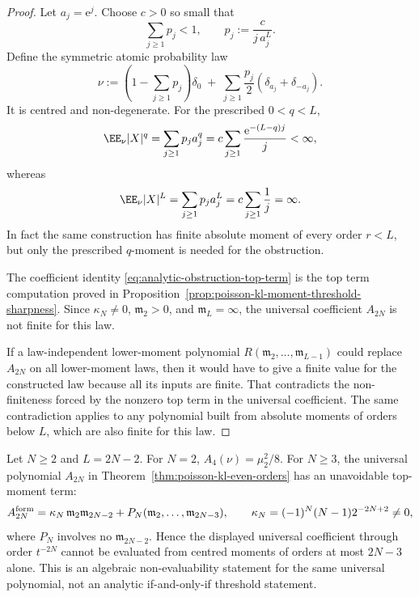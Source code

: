 \begin{proof}
Let \(a_j=\mathrm e^j\).  Choose \(c>0\) so small that
\[
\sum_{j\ge1}p_j<1,\qquad
p_j:=\frac{c}{j\,a_j^L}.
\]
Define the symmetric atomic probability law
\[
\nu:=\left(1-\sum_{j\ge1}p_j\right)\delta_0
\;+\;
\sum_{j\ge1}\frac{p_j}{2}(\delta_{a_j}+\delta_{-a_j}).
\]
It is centred and non-degenerate.  For the prescribed \(0<q<L\),
\[
\EE_\nu |X|^q=\sum_{j\ge1}p_ja_j^q
=c\sum_{j\ge1}\frac{\mathrm e^{-(L-q)j}}{j}<\infty,
\]
whereas
\[
\EE_\nu |X|^L=\sum_{j\ge1}p_ja_j^L
=c\sum_{j\ge1}\frac1j=\infty.
\]
In fact the same construction has finite absolute moment of every order
\(r<L\), but only the prescribed \(q\)-moment is needed for the obstruction.

The coefficient identity \eqref{eq:analytic-obstruction-top-term} is the top
term computation proved in
Proposition~\ref{prop:poisson-kl-moment-threshold-sharpness}.  Since
\(\kappa_N\ne0\), \(\mathfrak m_2>0\), and \(\mathfrak m_L=\infty\), the
universal coefficient \(A_{2N}\) is not finite for this law.

If a law-independent lower-moment polynomial
\(R(\mathfrak m_2,\ldots,\mathfrak m_{L-1})\) could replace \(A_{2N}\) on
all lower-moment laws, then it would have to give a finite value for the
constructed law because all its inputs are finite.  That contradicts the
non-finiteness forced by the nonzero top term in the universal coefficient.
The same contradiction applies to any polynomial built from absolute moments
of orders below \(L\), which are also finite for this law.
\end{proof}

\begin{proposition}%
\label{prop:poisson-kl-moment-threshold-sharpness}
Let \(N\ge2\) and \(L=2N-2\).
For \(N=2\), \(A_4(\nu)=\mu_2^2/8\).  For \(N\ge3\), the universal
polynomial \(A_{2N}\) in Theorem~\ref{thm:poisson-kl-even-orders} has an
unavoidable top-moment term:
\begin{equation}\label{eq:top-moment-coefficient-sharpness}
A_{2N}^{\rm form}
=\kappa_N\,\mathfrak m_2\mathfrak m_{2N-2}
 +P_N(\mathfrak m_2,\ldots,\mathfrak m_{2N-3}),
\qquad
\kappa_N=(-1)^N(N-1)2^{-2N+2}\ne0,
\end{equation}
where \(P_N\) involves no \(\mathfrak m_{2N-2}\).  Hence the displayed
universal coefficient through order \(t^{-2N}\) cannot be evaluated from
centred moments of orders at most \(2N-3\) alone.  This is an algebraic
non-evaluability statement for the same universal polynomial, not an
analytic if-and-only-if threshold statement.
\end{proposition}

